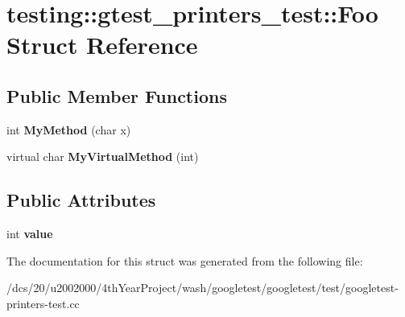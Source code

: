 \hypertarget{structtesting_1_1gtest__printers__test_1_1Foo}{}\section{testing\+:\+:gtest\+\_\+printers\+\_\+test\+:\+:Foo Struct Reference}
\label{structtesting_1_1gtest__printers__test_1_1Foo}
\subsection*{Public Member Functions}
\begin{DoxyCompactItemize}
\item 
\mbox{\label{structtesting_1_1gtest__printers__test_1_1Foo_a703c1159114f3a640b16d470a9613672}} 
int {\bfseries My\+Method} (char x)
\item 
\mbox{\label{structtesting_1_1gtest__printers__test_1_1Foo_a368dc5150b27c2aaca6034830334e1cd}} 
virtual char {\bfseries My\+Virtual\+Method} (int)
\end{DoxyCompactItemize}
\subsection*{Public Attributes}
\begin{DoxyCompactItemize}
\item 
\mbox{\label{structtesting_1_1gtest__printers__test_1_1Foo_a8171a69191d34071ea4448d2dda501ec}} 
int {\bfseries value}
\end{DoxyCompactItemize}


The documentation for this struct was generated from the following file\+:\begin{DoxyCompactItemize}
\item 
/dcs/20/u2002000/4th\+Year\+Project/wash/googletest/googletest/test/googletest-\/printers-\/test.\+cc\end{DoxyCompactItemize}
